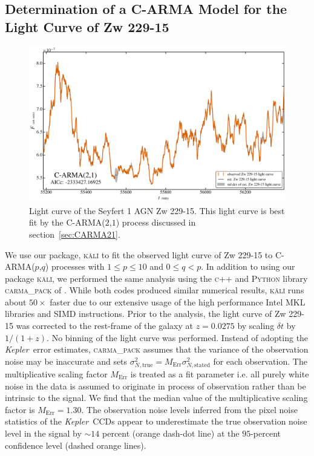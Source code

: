 \documentclass[a4paper,fleqn,usenatbib]{mnras}
\newcommand{\Kepler}{\textit{Kepler~}}
\begin{document}
\subsection[C-ARMA Model for Zw 229-15]{Determination of a C-ARMA Model for the Light Curve of Zw 229-15}\label{sec:Zw229-15CARMA}

\begin{figure}
    \includegraphics[width=\textwidth]{images/Zw229-15_LC.jpg}
    \caption{Light curve of the Seyfert 1 AGN Zw 229-15. This light curve is best fit by the C-ARMA($2$,$1$) process discussed in section~\ref{sec:CARMA21}.}
    \label{fig:Zw229-15_LC}
\end{figure}

We use our package, \textsc{k\={a}l\={i}} to fit the observed light curve of Zw 229-15 to C-ARMA($p$,$q$) processes with $1 \leq p \leq 10$ and $0 \leq q < p$. In addition to using our package \textsc{k\={a}l\={i}}, we performed the same analysis using the \textsc{c++} and \textsc{Python} library \textsc{carma\_pack} of \citet{Kelly14}. While both codes produced similar numerical results, \textsc{k\={a}l\={i}} runs about $50 \times$ faster due to our extensive usage of the high performance Intel MKL libraries and SIMD instructions. Prior to the analysis, the light curve of Zw 229-15 was corrected to the rest-frame of the galaxy at $z = 0.0275$ by scaling $\delta t$ by $1/(1+z)$. No binning of the light curve was performed. Instead of adopting the \Kepler error estimates, \textsc{carma\_pack} assumes that the variance of the observation noise may be inaccurate and sets $\sigma^{2}_{N,\mathrm{true}} = M_{\mathrm{Err}} \sigma^{2}_{N,\mathrm{stated}}$ for each observation. The multiplicative scaling factor $M_{\mathrm{Err}}$ is treated as a fit parameter i.e. all purely white noise in the data is assumed to originate in process of observation rather than be intrinsic to the signal. We find that the median value of the multiplicative scaling factor is $M_{\mathrm{Err}} = 1.30$. The observation noise levels inferred from the pixel noise statistics of the \Kepler CCDs appear to underestimate the true observation noise level in the signal by $\sim 14$ percent (orange dash-dot line) at the $95$-percent confidence level (dashed orange lines).
\end{document}
